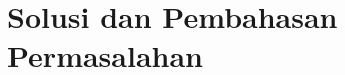 \documentclass[12pt, a4paper]{report}
\begin{document}







\chapter{Solusi dan Pembahasan Permasalahan}
\label{chap:solusi_permasalahan}








\newpage
\renewcommand{\bibname}{Daftar Pustaka}
\nocite{*}



\appendix


\end{document}
